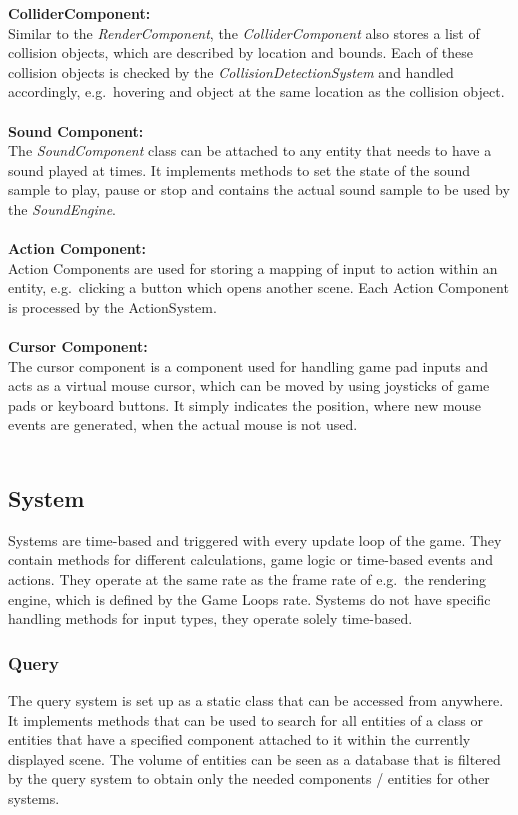 \textbf{ColliderComponent:} \\
Similar to the \textit{RenderComponent}, the \textit{ColliderComponent} also stores a list of collision objects, which are described by location and bounds.
Each of these collision objects is checked by the \textit{CollisionDetectionSystem} and handled accordingly, e.g.\
hovering and object at the same location as the collision object. \\ \\

\textbf{Sound Component:} \\
The \textit{SoundComponent} class can be attached to any entity that needs to have a sound played at times.
It implements methods to set the state of the sound sample to play, pause or stop and contains the actual sound sample to be used by the \textit{SoundEngine}. \\ \\

\textbf{Action Component:} \\
Action Components are used for storing a mapping of input to action within an entity, e.g.\ clicking a button which opens another scene.
Each Action Component is processed by the ActionSystem. \\ \\

\textbf{Cursor Component:} \\
The cursor component is a component used for handling game pad inputs and acts as a virtual mouse cursor, which can be moved by using
joysticks of game pads or keyboard buttons.
It simply indicates the position, where new mouse events are generated, when the actual mouse is not used. \\ \\

\subsection{System}\label{subsec:system}
Systems are time-based and triggered with every update loop of the game.
They contain methods for different calculations, game logic or time-based events and actions.
They operate at the same rate as the frame rate of e.g.\ the rendering engine, which is defined by the Game Loops rate.
Systems do not have specific handling methods for input types, they operate solely time-based.

\subsubsection{Query}\label{subsubsec:query2}
The query system is set up as a static class that can be accessed from anywhere.
It implements methods that can be used to search for all entities of a class or entities that have a specified component
attached to it within the currently displayed scene.
The volume of entities can be seen as a database that is filtered by the query system to obtain only the needed components / entities
for other systems. \todo{add graphic with database of ecs}

